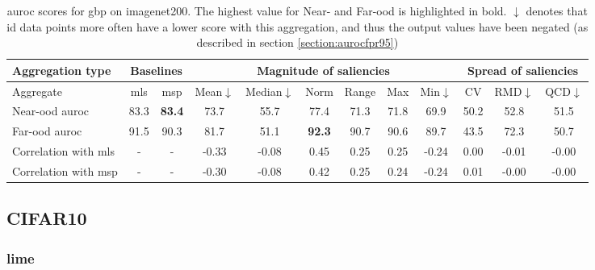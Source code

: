\documentclass[UKenglish]{uiomasterthesis} %
\theoremstyle{definition}
\begin{document}
\begin{table}[H]
\setlength\tabcolsep{4pt}
\begin{center}
\begin{tabular}{ |m{5em}|c c|c c c c c c|c c c| }
    \hline
     Aggregation type & \multicolumn{2}{c|}{Baselines} & \multicolumn{6}{c|}{Magnitude of saliencies} & \multicolumn{3}{c|}{Spread of saliencies} \\
    \hline
    Aggregate & \ac{mls} & \ac{msp} & Mean$\downarrow$ & Median$\downarrow$ & Norm & Range & Max & Min$\downarrow$ & CV & RMD$\downarrow$ & QCD$\downarrow$  \\
    \hline
    \rowcolor{near!50}
    Near-\ac{ood} \ac{auroc} & 83.3 &\textbf{ 83.4 }& 73.7 & 55.7 & 77.4 & 71.3 & 71.8 & 69.9 & 50.2 & 52.8 & 51.5  \\
    \hline
    \rowcolor{far!50}
    Far-\ac{ood} \ac{auroc} & 91.5 & 90.3 & 81.7 & 51.1 &\textbf{ 92.3 }& 90.7 & 90.6 & 89.7 & 43.5 & 72.3 & 50.7  \\
    \hline
    Correlation with \ac{mls}& - & - & -0.33 & -0.08 & 0.45 & 0.25 & 0.25 & -0.24 & 0.00 & -0.01 & -0.00  \\
    \hline
    Correlation with \ac{msp}& - & - & -0.30 & -0.08 & 0.42 & 0.25 & 0.24 & -0.24 & 0.01 & -0.00 & -0.00  \\
    \hline
    \end{tabular}
    \caption{\ac{auroc} scores for gbp on imagenet200. The highest value for Near- and Far-\ac{ood} is highlighted in bold. $\downarrow$ denotes that \ac{id} data points more often have a lower score with this aggregation, and thus the output values have been negated (as described in section \ref{section:aurocfpr95})}
    \label{table:imagenet200_gbp_metrics}
\end{center}
\setlength\tabcolsep{6pt}
\end{table}


\subsection{CIFAR10}


\subsubsection{\ac{lime}}
\end{document}
